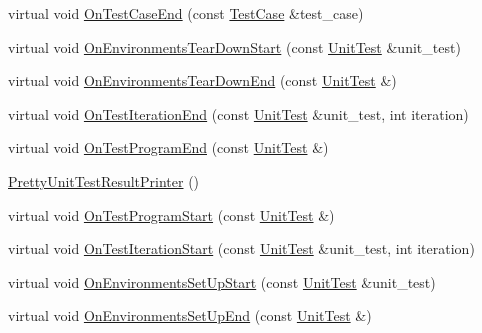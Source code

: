 \begin{DoxyCompactItemize}
virtual void \hyperlink{classtesting_1_1internal_1_1_pretty_unit_test_result_printer_a7a62fe58fa6f6aace813eb62b31e5a51}{On\-Test\-Case\-End} (const \hyperlink{classtesting_1_1_test_case}{Test\-Case} \&test\-\_\-case)
\item 
virtual void \hyperlink{classtesting_1_1internal_1_1_pretty_unit_test_result_printer_afea9dc849c92fdbc1d8505f4c74ffc1a}{On\-Environments\-Tear\-Down\-Start} (const \hyperlink{classtesting_1_1_unit_test}{Unit\-Test} \&unit\-\_\-test)
\item 
virtual void \hyperlink{classtesting_1_1internal_1_1_pretty_unit_test_result_printer_ab23094ef3b714778b2f742d39818c280}{On\-Environments\-Tear\-Down\-End} (const \hyperlink{classtesting_1_1_unit_test}{Unit\-Test} \&)
\item 
virtual void \hyperlink{classtesting_1_1internal_1_1_pretty_unit_test_result_printer_ac29b30216023baddda04ef5889f484ff}{On\-Test\-Iteration\-End} (const \hyperlink{classtesting_1_1_unit_test}{Unit\-Test} \&unit\-\_\-test, int iteration)
\item 
virtual void \hyperlink{classtesting_1_1internal_1_1_pretty_unit_test_result_printer_a8c92c062889abdb940b04ffe113f5980}{On\-Test\-Program\-End} (const \hyperlink{classtesting_1_1_unit_test}{Unit\-Test} \&)
\item 
\hyperlink{classtesting_1_1internal_1_1_pretty_unit_test_result_printer_a9219a4263ef0057c98a2a2a41f35ee15}{Pretty\-Unit\-Test\-Result\-Printer} ()
\item 
virtual void \hyperlink{classtesting_1_1internal_1_1_pretty_unit_test_result_printer_a7a6b6de195b4ef3c9f2edd2e6c270f3e}{On\-Test\-Program\-Start} (const \hyperlink{classtesting_1_1_unit_test}{Unit\-Test} \&)
\item 
virtual void \hyperlink{classtesting_1_1internal_1_1_pretty_unit_test_result_printer_ae1fb592555956930ad56e85727a86e7a}{On\-Test\-Iteration\-Start} (const \hyperlink{classtesting_1_1_unit_test}{Unit\-Test} \&unit\-\_\-test, int iteration)
\item 
virtual void \hyperlink{classtesting_1_1internal_1_1_pretty_unit_test_result_printer_af794208caa6ea4fcd91a4d4da0ec93c0}{On\-Environments\-Set\-Up\-Start} (const \hyperlink{classtesting_1_1_unit_test}{Unit\-Test} \&unit\-\_\-test)
\item 
virtual void \hyperlink{classtesting_1_1internal_1_1_pretty_unit_test_result_printer_aadba892f02606a8b0c5f5982b3553aac}{On\-Environments\-Set\-Up\-End} (const \hyperlink{classtesting_1_1_unit_test}{Unit\-Test} \&)
\item 

\end{DoxyCompactItemize}
